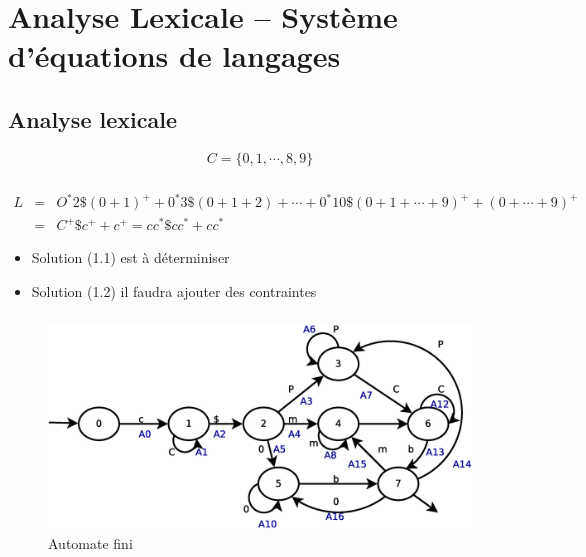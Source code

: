 \documentclass[12pt,a4paper,openany]{book}
\begin{document}
	\thispagestyle{empty} %
	\titleBC 
	\setcounter{tocdepth}{2}
	\setcounter{secnumdepth}{3}
	\tableofcontents
	\chapter{Analyse Lexicale -- Système d'équations de langages}
	\section{Analyse lexicale}
	$$C = \{0,1,\cdots,8,9\}$$
	\subsection{}
\begin{eqnarray}
	L &=&  O^*2\$(0+1)^{+}+0^*3\$(0+1+2)+\cdots +0^*10\$(0+1+\cdots+9)^{+}+(0+\cdots+9)^+\\
	&=& C^+\$c^++c^+ = cc^*\$cc^*+cc^*
\end{eqnarray}
\begin{remarque}
	\begin{itemize}
		\item Solution (1.1) est à déterminiser 
		\item Solution (1.2) il faudra ajouter des contraintes
	\end{itemize}
\end{remarque}


\subsection{}
\begin{figure}[H]
	\includegraphics[width=15cm]{Diagramme1.eps}
	\caption{Automate fini}
	\centering
\end{figure}

\end{document}

